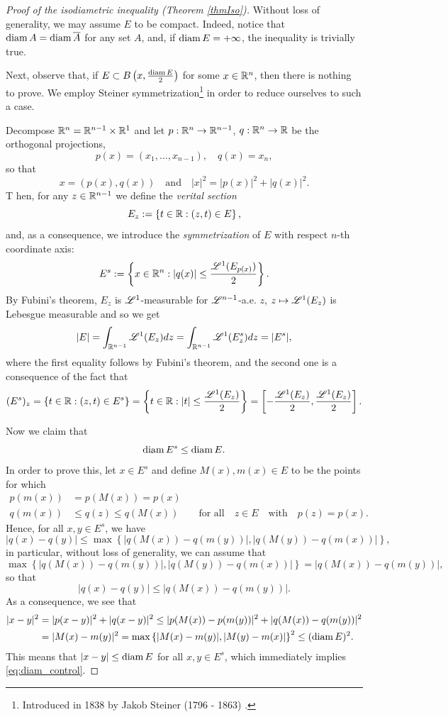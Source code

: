 \begin{proof}[Proof of the isodiametric inequality (Theorem \ref{thmIso})]
Without loss of generality, we may assume $E$ to be compact. Indeed, notice that $\operatorname{diam} A = \operatorname{diam} \overline{A}$ for any set $A$, and, if $\operatorname{diam} E = + \infty$, the inequality is trivially true.

Next, observe that, if $E \subset B\left (x, \frac{\operatorname{diam} E}{2}\right)$ for some $x \in \mathbb{R}^{n}$, then there is nothing to prove. We employ Steiner symmetrization\footnote{Introduced in 1838 by Jakob Steiner (1796 - 1863) \cite{steiner1838einfache}.} in order to reduce ourselves to such a case.

Decompose $\mathbb{R}^n = \mathbb{R}^{n-1}\times \mathbb{R}^1$ and let $p
: \mathbb{R}^n \to \mathbb{R}^{n-1}$, $q: \mathbb{R}^n \to \mathbb{R}$ be the orthogonal projections, $$p(x) = (x_{1}, \dots, x_{n - 1}), \quad q(x) =x_{n},$$ so that $$x = (p(x), q(x)) \quad \text{and} \quad |x|^2 = |p(x)|^2 + |q(x)|^2.$$ T
hen, for any $z \in \mathbb{R}^{n - 1}$ we define the {\em verital section}
\[
 E_z := \left\{t\in\mathbb{R} : (z,t) \in E\right\},
\]
and, as a consequence, we introduce the {\em symmetrization} of $E$ with respect $n$-th coordinate axis:
\[
E^s := \left\{ x \in \mathbb{R}^n: |q(x)| \leq \frac{\mathscr{L}^{1}(E_{p(x)})}{2}\right\}.
\]
By Fubini's theorem, $E_z$ is $\mathscr{L}^{1}$-measurable for
$\mathscr{L}^{n-1}$-a.e. $z$, $z \mapsto \mathscr{L}^{1}(E_z)$ is Lebesgue
measurable and so we get
\begin{equation} \label{eq:Lebesgue_symm_equality}
|E| = \int_{\mathbb{R}^{n-1}} \mathscr{L}^{1}(E_z) dz = \int_{\mathbb{R}^{n-1}}
\mathscr{L}^{1}(E_z^s) dz = |E^s|,
\end{equation}
where the first equality follows by Fubini's theorem, and the second one is a consequence of the fact that
\[
(E^s)_z = \{ t\in\mathbb{R} : (z,t) \in E^s \}
= \left\{ t\in \mathbb{R} : |t| \leq \frac{\mathscr{L}^{1}(E_z)}{2} \right\}
= \left[ - \frac{\mathscr{L}^{1}(E_z)}{2}, \frac{\mathscr{L}^{1}(E_z)}{2} \right].
\]

Now we claim that
\begin{equation} \label{eq:diam_control}
\operatorname{diam} E^s \leq \operatorname{diam} E.
\end{equation}
In order to prove this, let $x \in E^s$ and define $M(x), m(x)
\in E$ to be the points for which 
\[
\begin{aligned}
p(m(x)) &= p(M(x)) = p(x)
\\
q(m(x)) &\le q(z) \leq q(M(x))
\qquad \text{for all} \quad z \in E \quad \text{with} \quad p(z) = p(x).
\end{aligned}
\]
Hence, for all $x,y \in E^s$, we have
\[
|q(x) - q(y)| \leq \max \left\{|q(M(x)) - q(m(y))|, |q(M(y)) - q(m(x))|\right\},
\]
in particular, without loss of generality, we can assume that
$$\max \left\{|q(M(x)) - q(m(y))|, |q(M(y)) - q(m(x))|\right\} = |q(M(x)) - q(m(y))|,$$
so that
$$ |q(x) - q(y)| \leq |q(M(x)) - q(m(y))|.$$
As a consequence, we see that
\begin{align*}
|x-y|^2 & = |p(x-y)|^2 + |q(x-y)|^2 \leq |p(M(x)) - p(m(y))|^2 + |q(M(x)) - q(m(y))|^2 \\
& = |M(x) - m(y)|^2 = \max \left\{|M(x) - m(y)|, |M(y) - m(x)|\right\}^2 \leq (\operatorname{diam} E)^2 .
\end{align*}
This means that $|x - y| \leq \operatorname{diam} E$ for all $x,y \in E^s$, which immediately implies \eqref{eq:diam_control}.


\end{proof}
